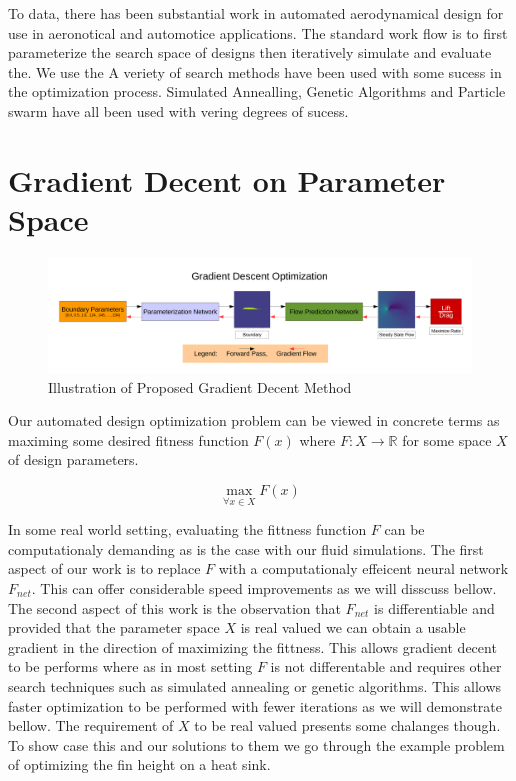 \documentclass{article} %
\begin{document}
To data, there has been substantial work in automated aerodynamical design for use in aeronotical and automotice applications. The standard work flow is to first parameterize the search space of designs then iteratively simulate and evaluate the. We use the A veriety of search methods have been used with some sucess in the optimization process. Simulated Annealling, Genetic Algorithms and Particle swarm have all been used with vering degrees of sucess. 


\section{Gradient Decent on Parameter Space}

\begin{figure}[h]
\begin{center}
\includegraphics[scale=0.34]{./gradient_descent_optimization.pdf}
\end{center}
\caption{Illustration of Proposed Gradient Decent Method}
\end{figure}


Our automated design optimization problem can be viewed in concrete terms as maximing some desired fitness function $F(x)$ where $F:X \rightarrow \mathbb{R}$ for some space $X$ of design parameters.

\begin{equation}
  \max_{\forall x \in X} F(x)
\end{equation}

In some real world setting, evaluating the fittness function $F$ can be computationaly demanding as is the case with our fluid simulations. The first aspect of our work is to replace $F$ with a computationaly effeicent neural network $F_{net}$. This can offer considerable speed improvements as we will disscuss bellow.  The second aspect of this work is the observation that $F_{net}$ is differentiable and provided that the parameter space $X$ is real valued we can obtain a usable gradient in the direction of maximizing the fittness. This allows gradient decent to be performs where as in most setting $F$ is not differentable and requires other search techniques such as simulated annealing or genetic algorithms. This allows faster optimization to be performed with fewer iterations as we will demonstrate bellow. The requirement of $X$ to be real valued presents some chalanges though. To show case this and our solutions to them we go through the example problem of optimizing the fin height on a heat sink.
\end{document}
